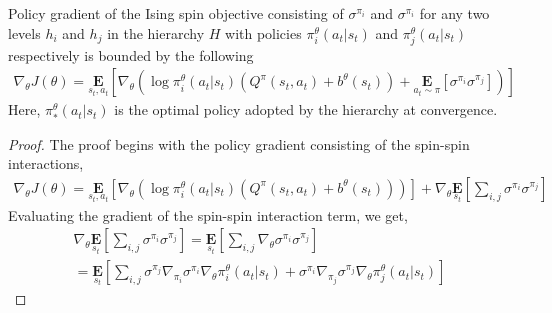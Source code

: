 \documentclass{article}
\begin{document}
\begin{prop}{4}\label{four}
    Policy gradient of the Ising spin objective consisting of $\sigma^{\pi_{i}}$  and $\sigma^{\pi_{i}}$ for any two levels $h_{i}$ and $h_{j}$ in the hierarchy $H$ with policies $\pi^{\theta}_{i}(a_{t}|s_{t})$ and $\pi^{\theta}_{j}(a_{t}|s_{t})$ respectively is bounded by the following 
    \begin{gather}
        \nabla_{\theta}J(\theta) = \underset{s_{t},a_{t}}{\textbf{E}}[\nabla_{\theta}(\log \pi^{\theta}_{i}(a_{t}|s_{t})(Q^{\pi}(s_{t},a_{t}) + b^{\theta}(s_{t})) + \underset{a_{t} \sim \pi}{\textbf{E}}[\sigma^{\pi_{i}}\sigma^{\pi_{j}}])] \nonumber
    \end{gather}
    Here, $\pi^{\theta}_{*}(a_{t}|s_{t})$ is the optimal policy adopted by the hierarchy at convergence.
\end{prop}
\begin{proof}
    The proof begins with the policy gradient consisting of the spin-spin interactions,
    \begin{gather}
        \nabla_{\theta}J(\theta) = \underset{s_{t},a_{t}}{\textbf{E}}[\nabla_{\theta}(\log \pi^{\theta}_{i}(a_{t}|s_{t})(Q^{\pi}(s_{t},a_{t}) + b^{\theta}(s_{t})))] + \nabla_{\theta}\underset{s_{t}}{\textbf{E}}[\sum_{i,j} \sigma^{\pi_{i}}\sigma^{\pi_{j}}] \nonumber
    \end{gather}
    Evaluating the gradient of the spin-spin interaction term, we get,
    \begin{gather}
        \nabla_{\theta} \underset{s_{t}}{\textbf{E}}[\sum_{i,j} \sigma^{\pi_{i}}\sigma^{\pi_{j}}] = \underset{s_{t}}{\textbf{E}}[\sum_{i,j} \nabla_{\theta}\sigma^{\pi_{i}}\sigma^{\pi_{j}}] \nonumber \\
        = \underset{s_{t}}{\textbf{E}}[\sum_{i,j} \sigma^{\pi_{j}} \nabla_{\pi_{i}}\sigma^{\pi_{i}}\nabla_{\theta}\pi^{\theta}_{i}(a_{t}|s_{t}) + \sigma^{\pi_{i}} \nabla_{\pi_{j}}\sigma^{\pi_{j}}\nabla_{\theta}\pi^{\theta}_{j}(a_{t}|s_{t})] \nonumber
    \end{gather}

\end{proof}


 

\end{document}

